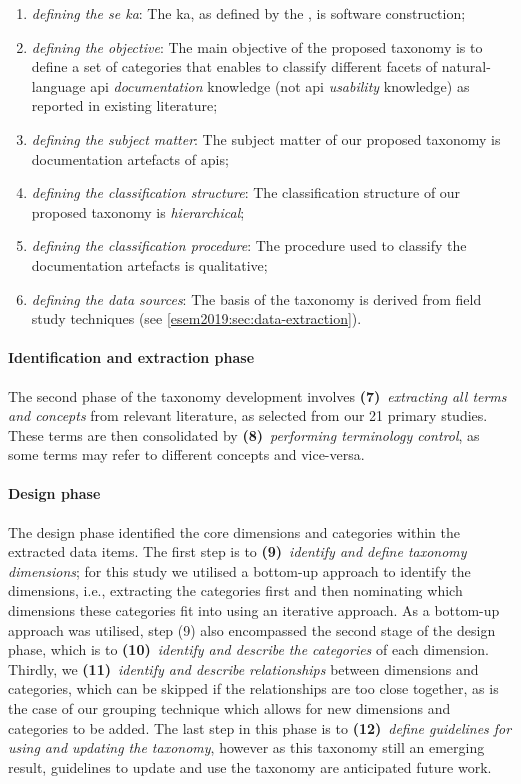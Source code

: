 \begin{enumerate}[label=\textbf{(\arabic*)}]
  \item \textit{defining the \gls{se} \gls{ka}}: The  \gls{ka}, as defined by the , is software construction;
  \item \textit{defining the objective}: The main objective of the proposed taxonomy is to define a set of categories that enables to classify different facets of natural-language \gls{api} \textit{documentation} knowledge (not \gls{api} \textit{usability} knowledge) as reported in existing literature;
  \item \textit{defining the subject matter}: The subject matter of our proposed taxonomy is  documentation artefacts of \glspl{api};
  \item \textit{defining the classification structure}: The classification structure of our  proposed taxonomy is \textit{hierarchical};
  \item \textit{defining the classification procedure}: The procedure used to classify the documentation artefacts is qualitative; 
  \item \textit{defining the data sources}: The basis of the taxonomy is derived from field study techniques (see \cref{esem2019:sec:data-extraction}).
\end{enumerate}

\paragraph{Identification and extraction phase} The second phase of the taxonomy development involves \textbf{(7)}~\textit{extracting all terms and concepts} from relevant literature, as selected from our 21 primary studies. These terms are then consolidated by \textbf{(8)}~\textit{performing terminology control}, as some terms may refer to different concepts and vice-versa.

\paragraph{Design phase} The design phase identified the core dimensions and categories within the extracted data items. The first step is to \textbf{(9)}~\textit{identify and define taxonomy dimensions}; for this study we utilised a bottom-up approach to identify the dimensions, i.e., extracting the categories first and then nominating which dimensions these categories fit into using an iterative approach. As a bottom-up approach was utilised, step (9) also encompassed the second stage of the design phase, which is to \textbf{(10)}~\textit{identify and describe the categories} of each dimension. Thirdly, we \textbf{(11)}~\textit{identify and describe relationships} between dimensions and categories, which can be skipped if the relationships are too close together, as is the case of our grouping technique which allows for new dimensions and categories to be added. The last step in this phase is to \textbf{(12)}~\textit{define guidelines for using and updating the taxonomy}, however as this taxonomy still an emerging result, guidelines to update and use the taxonomy are anticipated future work.

